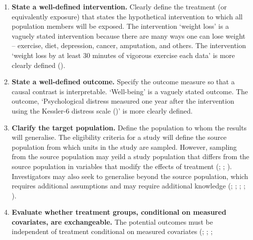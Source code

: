 \documentclass[
  single column]{article}
\begin{document}
\begin{enumerate}
\def\labelenumi{\arabic{enumi}.}
\item
  \textbf{State a well-defined intervention.} Clearly define the
  treatment (or equivalently exposure) that states the hypothetical
  intervention to which all population members will be exposed. The
  intervention `weight loss' is a vaguely stated intervention because
  there are many ways one can lose weight -- exercise, diet, depression,
  cancer, amputation, and others. The intervention `weight loss by at
  least 30 minutes of vigorous exercise each data' is more clearly
  defined
  ().
\item
  \textbf{State a well-defined outcome.} Specify the outcome measure so
  that a causal contrast is interpretable. `Well-being' is a vaguely
  stated outcome. The outcome, `Psychological distress measured one year
  after the intervention using the Kessler-6 distress scale
  ()' is more
  clearly defined.
\item
  \textbf{Clarify the target population.} Define the population to whom
  the results will generalise. The eligibility criteria for a study will
  define the source population from which units in the study are
  sampled. However, sampling from the source population may yeild a
  study population that differs from the source population in variables
  that modify the effects of treatment
  (;
  ;
  ).
  Investigators may also seek to generalise beyond the source
  population, which requires additional assumptions and may require
  additional knowledge (; ;
  ;
  ;
  ).
\item
  \textbf{Evaluate whether treatment groups, conditional on measured
  covariates, are exchangeable.} The potential outcomes must be
  independent of treatment conditional on measured covariates
  (;
  ;
  ;

\end{enumerate}
\end{document}
